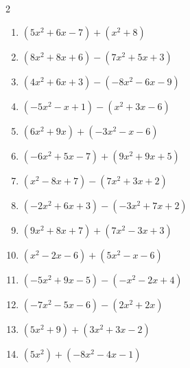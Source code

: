 \begin{multicols}{2}
\begin{enumerate}
  \item $(5x^{2}+6x-7)+(x^{2}+8)$


  \item $(8x^{2}+8x+6)-(7x^{2}+5x+3)$


  \item $(4x^{2}+6x+3)-(-8x^{2}-6x-9)$


  \item $(-5x^{2}-x+1)-(x^{2}+3x-6)$


  \item $(6x^{2}+9x)+(-3x^{2}-x-6)$


  \item $(-6x^{2}+5x-7)+(9x^{2}+9x+5)$


  \item $(x^{2}-8x+7)-(7x^{2}+3x+2)$


  \item $(-2x^{2}+6x+3)-(-3x^{2}+7x+2)$


  \item $(9x^{2}+8x+7)+(7x^{2}-3x+3)$


  \item $(x^{2}-2x-6)+(5x^{2}-x-6)$


  \item $(-5x^{2}+9x-5)-(-x^{2}-2x+4)$


  \item $(-7x^{2}-5x-6)-(2x^{2}+2x)$


  \item $(5x^{2}+9)+(3x^{2}+3x-2)$


  \item $(5x^{2})+(-8x^{2}-4x-1)$


\end{enumerate}
\end{multicols}
